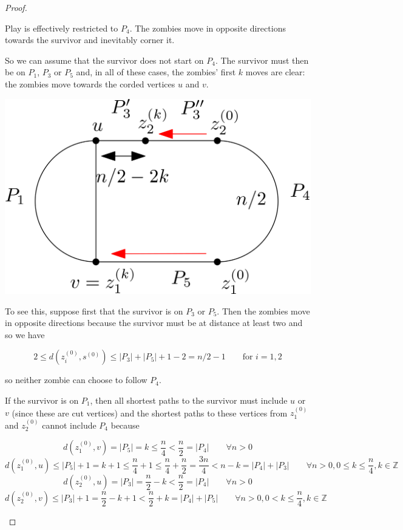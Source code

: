 \documentclass[letterpaper, 10pt]{article}
\newcommand{\Z}{\mathbb{Z}}
\begin{document}
\begin{proof}
\begin{proofpart}
Play is effectively restricted to $P_4$. The zombies
move in opposite directions towards the survivor and inevitably corner it.

So we can assume that the survivor does not start on $P_4$. The survivor must
then be on $P_1$, $P_3$ or $P_5$ and, in all of these cases, the zombies' first $k$
moves are clear: the zombies move towards the corded vertices $u$ and $v$.

\begin{center}
\includegraphics[scale=0.15]{diagram4}
\end{center}

To see this, suppose first that the survivor is on $P_3$ or $P_5$. Then the zombies move in opposite directions
because the survivor must be at distance at least two and so we have

\[ 2 \leq d(z_i^{(0)}, s^{(0)}) \leq |P_3| + |P_5| +1 -2 = n/2 - 1 \qquad \text{for $i = 1,2$} \]

so neither zombie can choose to follow $P_4$.

If the survivor is on $P_1$, then all shortest paths to the survivor must
include $u$ or $v$ (since these are cut vertices)
and the shortest paths to these vertices from $z_1^{(0)}$
and $z_2^{(0)}$ cannot include $P_4$ because

\[ d(z_1^{(0)}, v) = |P_5| = k \leq \frac{n}{4} < \frac{n}{2} = |P_4| \qquad \forall n > 0\]
\[ d(z_1^{(0)}, u) \leq |P_5| + 1 = k + 1 \leq \frac{n}{4} +1 \leq \frac{n}{4} + \frac{n}{2} = \frac{3n}{4} < n -k = |P_4| + |P_3| \qquad \forall n > 0, 0 \leq k \leq \frac{n}{4}, k \in \Z\]
\[ d(z_2^{(0)}, u) = |P_3| = \frac{n}{2} - k < \frac{n}{2} = |P_4| \qquad \forall n > 0\]
\[ d(z_2^{(0)}, v) \leq |P_3| + 1 = \frac{n}{2} - k + 1 < \frac{n}{2} + k = |P_4| + |P_5| \qquad \forall n > 0, 0 < k \leq \frac{n}{4}, k \in \Z\]


\end{proofpart}
\end{proof}
\end{document}
